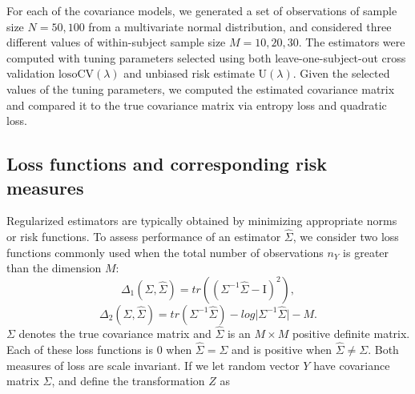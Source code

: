 For each of the covariance models, we generated a set of observations of sample size $N = 50, 100$ from a multivariate normal distribution, and considered three different values of within-subject sample size $M = 10, 20, 30$. The estimators were computed with tuning parameters selected using both leave-one-subject-out cross validation $\mbox{losoCV}\left(\lambda\right)$ and unbiased risk estimate $\mbox{U}\left(\lambda\right)$. Given the selected values of the tuning parameters, we computed the estimated covariance matrix and compared it to the true covariance matrix via entropy loss and quadratic loss. 

\bigskip


\subsection{Loss functions and corresponding risk measures}
Regularized estimators are typically obtained by minimizing appropriate norms or risk functions. To assess performance of an estimator $\hat{\Sigma}$, we consider two loss functions commonly used when the total number of observations $n_Y$ is greater than the dimension $M$:
\begin{equation} \label{eq:quad-loss}
\Delta_1\left(\Sigma,\hat{\Sigma} \right) = tr\left(\left( \Sigma^{-1} \hat{\Sigma} - \mathrm{I}\right)^2 \right),
\end{equation}
\noindent
\begin{equation} \label{eq:entropy-loss}
\Delta_2\left(\Sigma,\hat{\Sigma}\right) = tr\left( \Sigma^{-1} \hat{\Sigma} \right) - log \vert \Sigma^{-1} \hat{\Sigma} \vert - M.
\end{equation}
\noindent
$\Sigma$ denotes the true covariance matrix and $\hat{\Sigma}$ is an $M \times M$ positive definite matrix. Each of these loss functions is $0$ when $\hat{\Sigma} = \Sigma$ and is positive when $\hat{\Sigma} \ne \Sigma$. Both measures of loss are scale invariant. If we let random vector $Y$ have covariance matrix $\Sigma$, and define the transformation $Z$ as

